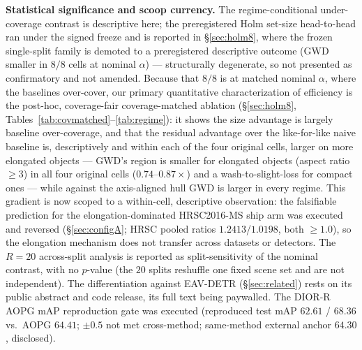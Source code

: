 \documentclass[journal]{IEEEtran}
\begin{document}
\textbf{Statistical significance and scoop currency.} The regime-conditional under-coverage contrast is
descriptive here; the preregistered Holm set-size head-to-head ran under the signed freeze and is reported in
\S\ref{sec:holm8}, where the frozen single-split family is demoted to a preregistered descriptive
outcome (GWD smaller in $8/8$ cells at nominal $\alpha$) --- structurally degenerate, so not presented as
confirmatory and not amended. Because that $8/8$ is at matched nominal $\alpha$, where the baselines
over-cover, our primary quantitative characterization of efficiency is the post-hoc, coverage-fair
coverage-matched ablation (\S\ref{sec:holm8}, Tables~\ref{tab:covmatched}--\ref{tab:regime}): it shows the
size advantage is largely baseline over-coverage, and that the residual advantage over the like-for-like
naive baseline is, descriptively and within each of the four original cells, larger on more elongated
objects --- GWD's region is smaller for elongated objects (aspect ratio $\ge3$) in all four original cells
($0.74$--$0.87\times$) and a wash-to-slight-loss for compact ones --- while against the axis-aligned hull GWD
is larger in every regime. This gradient is now
scoped to a within-cell, descriptive observation: the falsifiable prediction for the
elongation-dominated HRSC2016-MS ship arm was executed and reversed (\S\ref{sec:configA}; HRSC pooled
ratios $1.2413$/$1.0198$, both $\ge1.0$), so the elongation mechanism does not transfer across datasets or
detectors. The $R{=}20$ across-split analysis is reported as
split-sensitivity of the nominal contrast, with no $p$-value (the $20$ splits reshuffle one fixed
scene set and are not independent). The differentiation against EAV-DETR
\citep{eavdetr2026} (\S\ref{sec:related}) rests on its public abstract and code release, its full text being
paywalled. The DIOR-R AOPG mAP reproduction
gate was executed (reproduced test mAP $62.61$ / $68.36$ vs.\ AOPG $64.41$; $\pm0.5$ not met cross-method;
same-method external anchor $64.30$ \citep{ding2026rtoriented}, disclosed).
\end{document}

